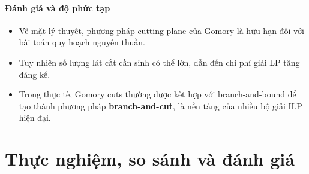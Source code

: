 \documentclass[fontsize=13pt,a4paper]{report}
\begin{document}
\paragraph{Đánh giá và độ phức tạp}

\begin{itemize}

  \item Về mặt lý thuyết, phương pháp cutting plane của Gomory là hữu hạn đối với bài toán quy hoạch nguyên thuần.

  \item Tuy nhiên số lượng lát cắt cần sinh có thể lớn, dẫn đến chi phí giải LP tăng đáng kể.

  \item Trong thực tế, Gomory cuts thường được kết hợp với branch-and-bound để tạo thành phương pháp \textbf{branch-and-cut}, là nền tảng của nhiều bộ giải ILP hiện đại.

\end{itemize}



\section{Thực nghiệm, so sánh và đánh giá}
\label{sec:result}
\end{document}
